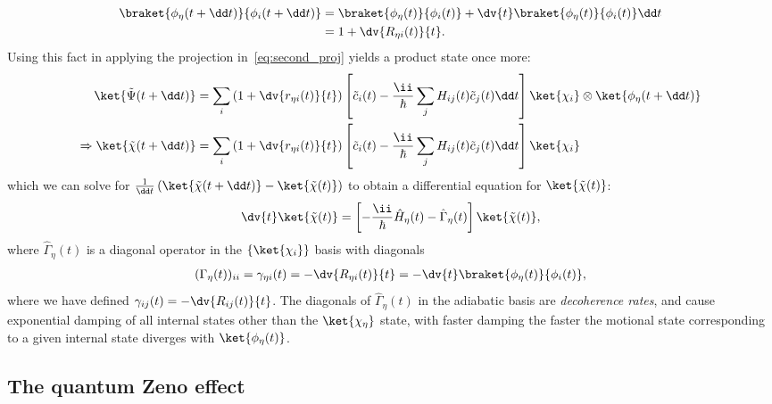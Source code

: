 \begin{align}
\braket{\phi_\eta(t + \dd t)}{\phi_i(t + \dd t)} &= \braket{\phi_\eta(t)}{\phi_i(t)} + \dv{t}\braket{\phi_\eta(t)}{\phi_i(t)}\dd t\\
& = 1 + \dv{R_{\eta i}(t)}{t}.
\end{align}
Using this fact in applying the projection in~\eqref{eq:second_proj} yields a product state once more:
\begin{align}
\ket{\tilde \Psi(t + \dd t)} &= 
\sum_i
\left(1 + \dv{r_{\eta i}(t)}{t}\right)
\left[\tilde c_i(t) - \frac{\ii}\hbar\sum_j H_{ij}(t) \tilde c_j(t)\dd t\right]
\ket{\chi_i}\otimes\ket{\phi_\eta(t + \dd t)}\\
\Rightarrow \ket{\tilde \chi(t + \dd t)} &= \sum_i
\left(1 + \dv{r_{\eta i}(t)}{t}\right)
\left[\tilde c_i(t) - \frac{\ii}\hbar\sum_j H_{ij}(t) \tilde c_j(t)\dd t\right]
\ket{\chi_i}
\end{align}
which we can solve for $\frac1{\dd t}\left(\ket{\tilde \chi(t + \dd t)} - \ket{\tilde \chi(t)}\right)$ to obtain a differential equation for $\ket{\tilde \chi(t)}$:
\begin{align}
\dv{t} \ket{\tilde \chi(t)} =
\left[-\frac\ii\hbar\hat H_\eta(t) - \hat\Gamma_\eta(t)\right]\ket{\tilde\chi(t)},
\end{align}
where $\hat\Gamma_\eta(t)$ is a diagonal operator in the $\{\ket{\chi_i}\}$ basis with diagonals
\begin{align}
(\Gamma_\eta(t))_{ii} = \gamma_{\eta i}(t) = -\dv{R_{\eta i}(t)}{t} = -\dv{t} \braket{\phi_\eta(t)}{\phi_i(t)},
\end{align}
where we have defined $\gamma_{ij}(t) = -\dv{R_{ij}(t)}{t}$. The diagonals of $\hat \Gamma_\eta(t)$ in the adiabatic basis are \emph{decoherence rates}, and cause exponential damping of all internal states other than the $\ket{\chi_\eta}$ state, with faster damping the faster the motional state corresponding to a given internal state diverges with $\ket{\phi_\eta(t)}$.

\subsection{The quantum Zeno effect}\label{sec:zeno_effect}

